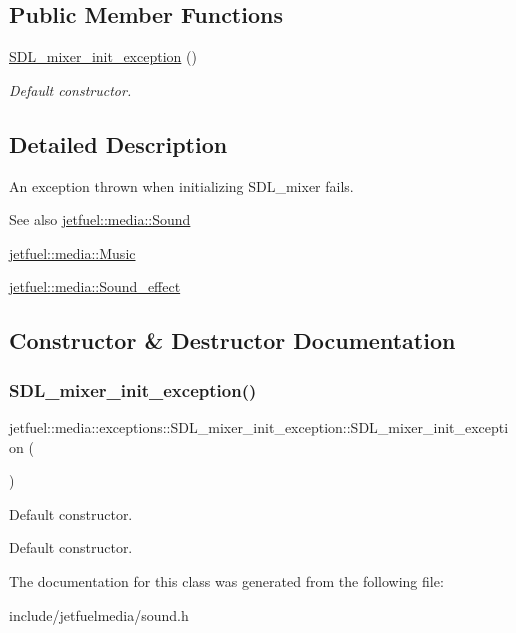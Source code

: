 \subsection*{Public Member Functions}
\begin{DoxyCompactItemize}
\item 
\hyperlink{classjetfuel_1_1media_1_1exceptions_1_1SDL__mixer__init__exception_ad590081466a937313ebd7533a2a19692}{S\+D\+L\+\_\+mixer\+\_\+init\+\_\+exception} ()
\begin{DoxyCompactList}\small\item\em Default constructor. \end{DoxyCompactList}\end{DoxyCompactItemize}


\subsection{Detailed Description}
An exception thrown when initializing S\+D\+L\+\_\+mixer fails.

\begin{DoxySeeAlso}{See also}
\hyperlink{classjetfuel_1_1media_1_1Sound}{jetfuel\+::media\+::\+Sound} 

\hyperlink{classjetfuel_1_1media_1_1Music}{jetfuel\+::media\+::\+Music} 

\hyperlink{classjetfuel_1_1media_1_1Sound__effect}{jetfuel\+::media\+::\+Sound\+\_\+effect} 
\end{DoxySeeAlso}


\subsection{Constructor \& Destructor Documentation}
\mbox{\label{classjetfuel_1_1media_1_1exceptions_1_1SDL__mixer__init__exception_ad590081466a937313ebd7533a2a19692}} 
\subsubsection{\texorpdfstring{S\+D\+L\+\_\+mixer\+\_\+init\+\_\+exception()}{SDL\_mixer\_init\_exception()}}
{\footnotesize\ttfamily jetfuel\+::media\+::exceptions\+::\+S\+D\+L\+\_\+mixer\+\_\+init\+\_\+exception\+::\+S\+D\+L\+\_\+mixer\+\_\+init\+\_\+exception (\begin{DoxyParamCaption}{ }\end{DoxyParamCaption})\hspace{0.3cm}{\ttfamily [inline]}}



Default constructor. 

Default constructor. 

The documentation for this class was generated from the following file\+:\begin{DoxyCompactItemize}
\item 
include/jetfuelmedia/sound.\+h\end{DoxyCompactItemize}
